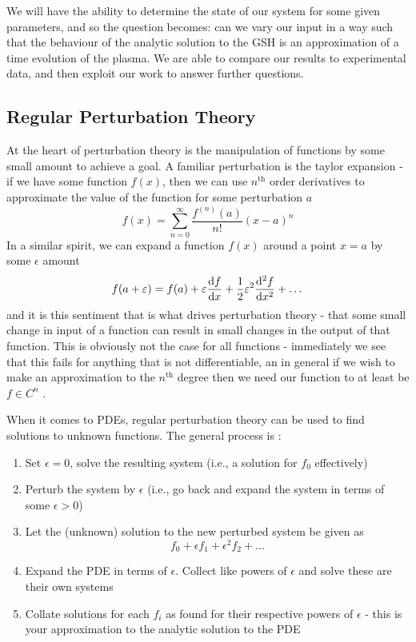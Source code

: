 We will have the ability to determine the 
state of our system for some given parameters, and so the question becomes: can 
we vary our input in a way such that the behaviour of the analytic solution to 
the GSH is an approximation of a time evolution of the plasma. We are able to compare 
our results to experimental data, and then exploit our work to answer further questions.



\subsection{Regular Perturbation Theory}

At the heart of perturbation theory is the manipulation of functions by some small amount to achieve a goal. A familiar 
perturbation is the taylor expansion - if we have some function $f(x)$, then we can use $n^{\text{th}}$ order derivatives to approximate 
the value of the function for some perturbation $a$
\begin{equation*}
    f(x) = \sum_{n = 0}^{\infty} \frac{f^{(n)}(a)}{n!} (x - a)^n
\end{equation*}
In a similar spirit, we can expand a function $f(x)$ around a point $x = a$ by some $\epsilon$ amount
$$f(a + \varepsilon) = f(a) + \varepsilon \dv{f}{x}(a) + \frac{1}{2} \varepsilon^2 \dv[2]{f}{x}(a) + \dots$$
and it is this sentiment that is what drives perturbation theory - that some small change in input of a function can result 
in small changes in the output of that function. This is obviously not the case for all functions - immediately we see that this 
fails for anything that is not differentiable, an in general if we wish to make an approximation to the $n^{\text{th}}$ degree then 
we need our function to at least be $f \in C^n$ \cite{perturbation-basics}. 

When it comes to PDEs, regular perturbation theory can be used to find solutions to unknown functions. The general process is \cite{perturbation-basics}:
\begin{enumerate}
    \item Set $\epsilon = 0$, solve the resulting system (i.e., a solution for $f_0$ effectively)
    \item Perturb the system by $\epsilon$ (i.e., go back and expand the system in terms of some $\epsilon > 0$)
    \item Let the (unknown) solution to the new perturbed system be given as
    $$f_0 + \epsilon f_1 + \epsilon^2 f_2 + \dots$$
    \item Expand the PDE in terms of $\epsilon$. Collect like powers of $\epsilon$ and solve these are their own systems
    \item Collate solutions for each $f_i$ as found for their respective powers of $\epsilon$ - this is your approximation 
    to the analytic solution to the PDE
\end{enumerate}

